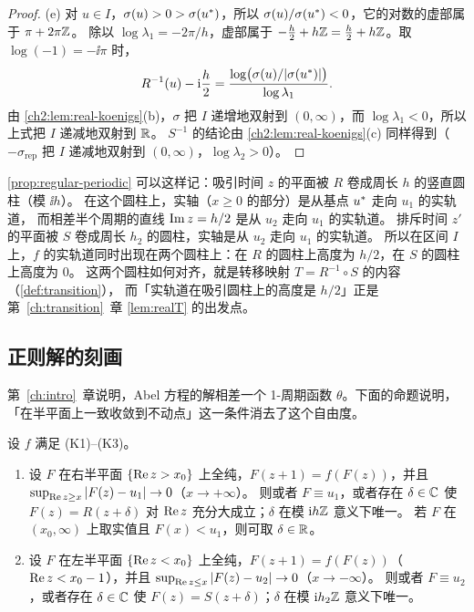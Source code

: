 \begin{proof}
(e) 对 $u\in I$，$\sigma(u)>0>\sigma(u^{*})$，所以 $\sigma(u)/\sigma(u^{*})<0$，它的对数的虚部属于 $\pi+2\pi\mathbb{Z}$。
除以 $\log\lambda_1=-2\pi/h$，虚部属于 $-\frac h2+h\mathbb{Z}=\frac h2+h\mathbb{Z}$。取 $\log(-1)=-\ii\pi$ 时，
\[
  R^{-1}(u)-\mathrm{i}\frac h2=\frac{\log\bigl(\sigma(u)/|\sigma(u^{*})|\bigr)}{\log\lambda_1}.
\]
由 \cref{ch2:lem:real-koenigs}(b)，$\sigma$ 把 $I$ 递增地双射到 $(0,\infty)$，而 $\log\lambda_1<0$，所以上式把 $I$ 递减地双射到 $\mathbb{R}$。
$S^{-1}$ 的结论由 \cref{ch2:lem:real-koenigs}(c) 同样得到（$-\sigma_{\mathrm{rep}}$ 把 $I$ 递减地双射到 $(0,\infty)$，$\log\lambda_2>0$）。
\end{proof}

\begin{remark}\label{ch2:rem:period-picture}
\cref{prop:regular-periodic} 可以这样记：吸引时间 $z$ 的平面被 $R$ 卷成周长 $h$ 的竖直圆柱（模 $\ii h$）。
在这个圆柱上，实轴（$x\ge0$ 的部分）是从基点 $u^{*}$ 走向 $u_1$ 的实轨道，
而相差半个周期的直线 $\operatorname{Im} z=h/2$ 是从 $u_2$ 走向 $u_1$ 的实轨道。
排斥时间 $z'$ 的平面被 $S$ 卷成周长 $h_2$ 的圆柱，实轴是从 $u_2$ 走向 $u_1$ 的实轨道。
所以在区间 $I$ 上，$f$ 的实轨道同时出现在两个圆柱上：在 $R$ 的圆柱上高度为 $h/2$，在 $S$ 的圆柱上高度为 $0$。
这两个圆柱如何对齐，就是转移映射 $T=R^{-1}\circ S$ 的内容（\cref{def:transition}），
而「实轨道在吸引圆柱上的高度是 $h/2$」正是第~\ref{ch:transition}~章 \cref{lem:realT} 的出发点。
\end{remark}

\subsection{正则解的刻画}

第~\ref{ch:intro}~章说明，Abel 方程的解相差一个 1-周期函数 $\theta$。下面的命题说明，「在半平面上一致收敛到不动点」这一条件消去了这个自由度。

\begin{proposition}[正则解的唯一性]\label{ch2:prop:regular-unique}
设 $f$ 满足 \textup{(K1)--(K3)}。
\begin{enumerate}[label=(\alph*)]
\item 设 $F$ 在右半平面 $\{\operatorname{Re} z>x_0\}$ 上全纯，$F(z+1)=f(F(z))$，并且 $\sup_{\operatorname{Re} z\ge x}|F(z)-u_1|\to0$（$x\to+\infty$）。
  则或者 $F\equiv u_1$，或者存在 $\delta\in\mathbb{C}$ 使 $F(z)=R(z+\delta)$ 对 $\operatorname{Re} z$ 充分大成立；$\delta$ 在模 $\mathrm{i} h\mathbb{Z}$ 意义下唯一。
  若 $F$ 在 $(x_0,\infty)$ 上取实值且 $F(x)<u_1$，则可取 $\delta\in\mathbb{R}$。
\item 设 $F$ 在左半平面 $\{\operatorname{Re} z<x_0\}$ 上全纯，$F(z+1)=f(F(z))$（$\operatorname{Re} z<x_0-1$），并且 $\sup_{\operatorname{Re} z\le x}|F(z)-u_2|\to0$（$x\to-\infty$）。
  则或者 $F\equiv u_2$，或者存在 $\delta\in\mathbb{C}$ 使 $F(z)=S(z+\delta)$；$\delta$ 在模 $\mathrm{i} h_2\mathbb{Z}$ 意义下唯一。
\end{enumerate}
\end{proposition}

